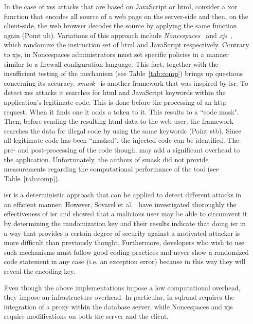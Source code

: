 \documentclass[conference]{IEEEtran}
\begin{document}
In the case of {\sc xss} attacks that are based on JavaScript or {\sc
  html}, consider a {\sc xor} function that encodes all source of a
web page on the server-side and then, on the client-side, the web
browser decodes the source by applying the same function again (Point
{\sc ub}). Variations of this approach include {\it
  Noncespaces}~\cite{GC09} and {\it x{\sc js}}~\cite{APKLM10}, which
randomize the instruction set of {\sc html} and JavaScript
respectively. Contrary to x{\sc js}, in Noncespaces administrators
must set specific policies in a manner similar to a firewall
configuration language. This fact, together with the insufficient
testing of the mechanism (see Table~\ref{tab:comp}) brings up
questions concerning its accuracy. {\it {\sc
    sm}ask}~\cite{JB07} is another framework that was inspired by {\sc
  isr}. To detect {\sc xss} attacks it searches for {\sc html} and
JavaScript keywords within the application's legitimate code. This is
done before the processing of an {\sc http} request. When it finds one
it adds a token to it. This results to a ``code mask". Then, before
sending the resulting {\sc html} data to the web user, the framework
searches the data for illegal code by using the same keywords (Point
{\sc s}t{\sc b}). Since all legitimate code has been ``masked", the injected
code can be identified. The pre- and post-processing of the code
though, may add a significant overhead to the application.
Unfortunately, the authors of {\sc sm}ask did not provide measurements
regarding the computational performance of the tool (see
Table~\ref{tab:comp}).

{\sc isr} is a deterministic approach that can be applied to detect
different attacks in an efficient manner. However, Sovarel et
al.~\cite{SEP05} have investigated thoroughly the effectiveness of
{\sc isr} and showed that a malicious user may be able to circumvent
it by determining the randomization key and their results indicate
that doing {\sc isr} in a way that provides a certain degree of
security against a motivated attacker is more difficult than
previously thought. Furthermore, developers who wish to use such
mechanisms must follow good coding practices and never show a
randomized code statement in any case (i.e. an exception error)
because in this way they will reveal the encoding key.

Even though the above implementations impose a low computational
overhead, they impose an infrastructure overhead. In particular, in
{\sc sql}rand requires the integration of a proxy within the database
server, while Noncespaces and x{\sc js} require modifications on both
the server and the client.
\end{document}
